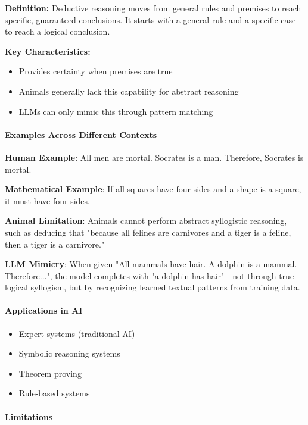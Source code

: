 \textbf{Definition:} Deductive reasoning moves from general rules and premises to reach specific, guaranteed conclusions. It starts with a general rule and a specific case to reach a logical conclusion.

\textbf{Key Characteristics:}

\begin{itemize}
\item Provides certainty when premises are true
\item Animals generally lack this capability for abstract reasoning
\item LLMs can only mimic this through pattern matching
\end{itemize}

\paragraph{Examples Across Different Contexts}

\textbf{Human Example}: All men are mortal. Socrates is a man. Therefore, Socrates is mortal.

\textbf{Mathematical Example}: If all squares have four sides and a shape is a square, it must have four sides.

\textbf{Animal Limitation}: Animals cannot perform abstract syllogistic reasoning, such as deducing that "because all felines are carnivores and a tiger is a feline, then a tiger is a carnivore."

\textbf{LLM Mimicry}: When given "All mammals have hair. A dolphin is a mammal. Therefore...", the model completes with "a dolphin has hair"—not through true logical syllogism, but by recognizing learned textual patterns from training data.

\paragraph{Applications in AI}

\begin{itemize}
\item Expert systems (traditional AI)
\item Symbolic reasoning systems
\item Theorem proving
\item Rule-based systems
\end{itemize}

\paragraph{Limitations}

